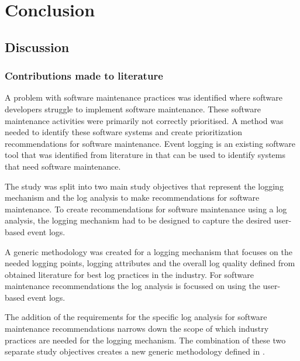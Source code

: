 \chapter{Conclusion}
\label{chap:4}

\section{Discussion}

\subsection{Contributions made to literature}
A problem with software maintenance practices was identified where software developers struggle to
implement software maintenance. These software maintenance activities were primarily not correctly
prioritised. A method was needed to identify these software systems and create prioritization
recommendations for software maintenance. Event logging is an existing software tool that was
identified from literature in  that can be used to identify systems that need software
maintenance. \par The study was split into two main study objectives that represent the logging
mechanism and the log analysis to make recommendations for software maintenance. To create
recommendations for software maintenance using a log analysis, the logging mechanism had to be
designed to capture the desired user-based event logs. \par A generic methodology was created for a
logging mechanism that focuses on the needed logging points, logging attributes and the overall log
quality defined from obtained literature for best log practices in the industry. For software
maintenance recommendations the log analysis is focussed on using the user-based event logs.\par The
addition of the requirements for the specific log analysis for software maintenance recommendations
narrows down the scope of which industry practices are needed for the logging mechanism. The
combination of these two separate study objectives creates a new generic methodology defined in
.


